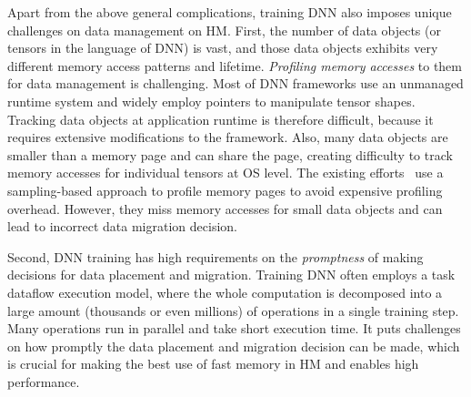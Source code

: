 \textcolor{check}{Apart from the above general complications, training DNN also imposes unique challenges on data management on HM. }
\textcolor{check}{First, the number of data objects (or tensors in the language of DNN) is vast, and those data objects exhibits very different memory access patterns and lifetime. } \textit{Profiling memory accesses} to them for data management is challenging. Most of DNN frameworks use an unmanaged runtime system and widely employ pointers to manipulate tensor shapes. \textcolor{check}{Tracking data objects at application runtime is therefore difficult, because it requires extensive modifications to the framework.} Also, many data objects are smaller than a memory page and can share the page, creating difficulty to track memory accesses for individual tensors at OS level. \textcolor{check}{The existing efforts~\cite{Thermostat:asplos17,RAMinate:socc16,heteros:isca17,sc18:wu,unimem:sc17} use a sampling-based approach to profile memory pages to avoid expensive profiling overhead. However, they miss memory accesses for small data objects and can lead to incorrect data migration decision.}

\textcolor{check}{Second, DNN training has high requirements on the \emph{promptness} of making decisions for data placement and migration. } Training DNN often employs a task dataflow execution model, where the whole computation is decomposed into a large amount (thousands or even millions) of operations in a single training step. 
Many operations run in parallel and take short execution time. 
\textcolor{check}{It puts challenges on how promptly the data placement and migration decision can be made, which is crucial for making the best use of fast memory in HM and enables high performance. }


